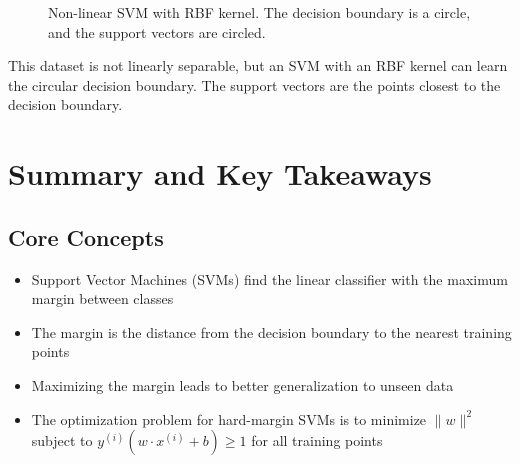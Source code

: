 \documentclass{article}
\begin{document}
\begin{figure}[h]
\centering
{}
\caption{Non-linear SVM with RBF kernel. The decision boundary is a circle, and the support vectors are circled.}
\end{figure}

This dataset is not linearly separable, but an SVM with an RBF kernel can learn the circular decision boundary. The support vectors are the points closest to the decision boundary.

\section{Summary and Key Takeaways}

\subsection{Core Concepts}
\begin{itemize}
    \item Support Vector Machines (SVMs) find the linear classifier with the maximum margin between classes
    \item The margin is the distance from the decision boundary to the nearest training points
    \item Maximizing the margin leads to better generalization to unseen data
    \item The optimization problem for hard-margin SVMs is to minimize $\|w\|^2$ subject to $y^{(i)}(w \cdot x^{(i)} + b) \geq 1$ for all training points
\end{itemize}
\end{document}
